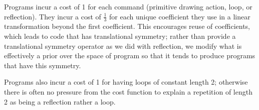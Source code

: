 \documentclass{article}
\newcommand{\probability}{\mathds{P}} %
\begin{document}
Programs incur a cost of 1 for each command (primitive drawing action,
loop, or reflection).  They incur a cost of $\frac{1}{3}$ for each
unique coefficient they use in a linear transformation beyond the
first coefficient. This encourages reuse of coefficients, which leads
to code that has translational symmetry; rather than provide a
translational symmetry operator as we did with reflection, we modify
what is effectively a prior over the space of program so that it tends
to produce programs that have this symmetry.

Programs also incur a cost of 1 for having loops of constant length 2;
otherwise there is often no pressure from the cost function to explain
a repetition of length 2 as being a reflection rather a loop.





\end{document}
